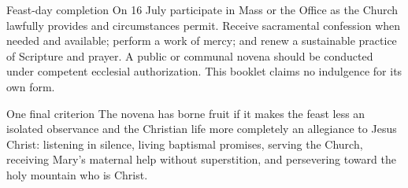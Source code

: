 \begin{studybox}{Feast-day completion}
On 16 July participate in Mass or the Office as the Church lawfully provides and circumstances permit. Receive sacramental confession when needed and available; perform a work of mercy; and renew a sustainable practice of Scripture and prayer. A public or communal novena should be conducted under competent ecclesial authorization. This booklet claims no indulgence for its own form.
\end{studybox}

\begin{studybox}{One final criterion}
The novena has borne fruit if it makes the feast less an isolated observance and the Christian life more completely an allegiance to Jesus Christ: listening in silence, living baptismal promises, serving the Church, receiving Mary's maternal help without superstition, and persevering toward the holy mountain who is Christ.
\end{studybox}
